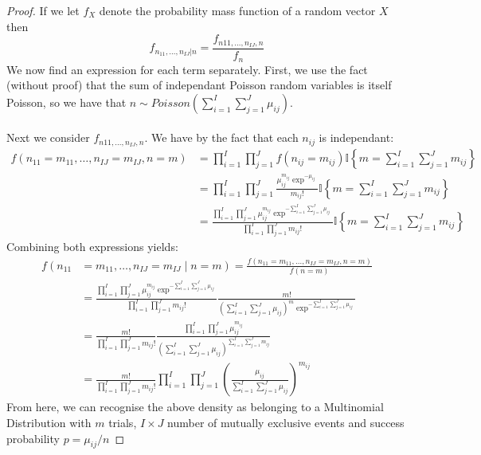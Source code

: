 \documentclass[nocolor]{report}
\begin{document}
\begin{proof}
    If we let $f_X$ denote the probability mass function of a random vector $X$ then
    $$f_{n_{11}, \dots, n_{IJ} | n} = \frac{f_{n11, \dots, n_{IJ}, n}}{f_n}$$
    We now find an expression for each term separately. First, we use the fact (without proof) that the sum of independant Poisson random variables is itself Poisson, so we have that 
    $n \sim Poisson(\sum_{i=1}^{I}\sum_{j=1}^{J}\mu_{ij})$. \\
    \\
    Next we consider $f_{n11, \dots, n_{IJ}, n}$. We have by the fact that each $n_{ij}$ is independant:
    \begin{align*}
         f\left(n_{11}=m_{11}, \ldots, n_{I J}=m_{I J}, n=m\right) & =\prod_{i=1}^I \prod_{j=1}^J f\left(n_{i j}=m_{i j}\right) \mathbb{I}\left\{m=\sum_{i=1}^I \sum_{j=1}^J m_{i j}\right\} \\ & =\prod_{i=1}^I \prod_{j=1}^J \frac{\mu_{i j}^{m_{i j}} \exp ^{-\mu_{i j}}}{m_{i j} !} \mathbb{I}\left\{m=\sum_{i=1}^I \sum_{j=1}^J m_{i j}\right\} \\ & =\frac{\prod_{i=1}^I \prod_{j=1}^J \mu_{i j}^{m_{i j}} \exp ^{-\sum_{i=1}^I \sum_{j=1}^J \mu_{i j}}}{\prod_{i=1}^I \prod_{j=1}^J m_{i j} !} \mathbb{I}\left\{m=\sum_{i=1}^I \sum_{j=1}^J m_{i j}\right\}
    \end{align*}
    Combining both expressions yields: 
    \begin{align*}
        f\left(n_{11}\right. & \left.=m_{11}, \ldots, n_{I J}=m_{I J} \mid n=m\right)=\frac{f\left(n_{11}=m_{11}, \ldots, n_{I J}=m_{I J}, n=m\right)}{f(n=m)} \\ & =\frac{\prod_{i=1}^I \prod_{j=1}^J \mu_{i j}^{m_{i j}} \exp ^{-\sum_{i=1}^I \sum_{j=1}^J \mu_{i j}}}{\prod_{i=1}^I \prod_{j=1}^J m_{i j} !} \frac{m !}{\left(\sum_{i=1}^I \sum_{j=1}^J \mu_{i j}\right)^m \exp ^{-\sum_{i=1}^I \sum_{j=1}^J \mu_{i j}}} \\ & =\frac{m !}{\prod_{i=1}^I \prod_{j=1}^J m_{i j} !} \frac{\prod_{i=1}^I \prod_{j=1}^J \mu_{i j}^{m_{i j}}}{\left(\sum_{i=1}^I \sum_{j=1}^J \mu_{i j}\right)^{\sum_{i=1}^I \sum_{j=1}^J m_{i j}}} \\ & =\frac{m !}{\prod_{i=1}^I \prod_{j=1}^J m_{i j} !} \prod_{i=1}^I \prod_{j=1}^J\left(\frac{\mu_{i j}}{\sum_{i=1}^I \sum_{j=1}^J \mu_{i j}}\right)^{m_{i j}}
    \end{align*}
    From here, we can recognise the above density as belonging to a Multinomial Distribution with $m$ trials, $I\times J$ number of mutually exclusive events and success probability 
    $p = \mu_{ij} / n$
    
\end{proof}
\end{document}
